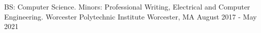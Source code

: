 

\begin{cventries}

  \cventry
    {BS: Computer Science. Minors: Professional Writing, Electrical and Computer Engineering.} %
    {Worcester Polytechnic Institute} %
    {Worcester, MA} %
    {August 2017 - May 2021} %
    {
    }
\end{cventries}
